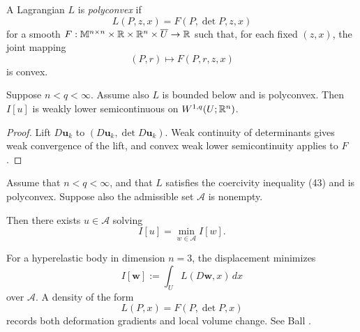 \begin{definition}
\label{def:polyconvex-lagrangian}
A Lagrangian $L$ is \textit{polyconvex} if
\[
L(P,z,x)=F(P,\det P,z,x)
\tag{51}
\]
for a smooth $F:\mathbb M^{n\times n}\times\mathbb{R}\times\mathbb{R}^n\times\overline U\to\mathbb{R}$ such that, for each fixed $(z,x)$, the joint mapping
\[
(P,r)\longmapsto F(P,r,z,x)
\tag{52}
\]
is convex.
\end{definition}

\begin{theorem}
\label{thm:lower-semicontinuity-polyconvex}

Suppose $n < q < \infty$. Assume also $L$ is bounded below and is polyconvex. Then $I[u]$ is weakly lower semicontinuous on $W^{1,q}(U;\mathbb{R}^n)$.
\end{theorem}

\begin{proof}
\sketch Lift $D\mathbf u_k$ to $(D\mathbf u_k,\det D\mathbf u_k)$. Weak continuity of determinants gives weak convergence of the lift, and convex weak lower semicontinuity applies to $F$.
\end{proof}

\begin{theorem}
\label{thm:existence-minimizer-polyconvex}

Assume that $n < q < \infty$, and that $L$ satisfies the coercivity inequality (43) and is polyconvex. Suppose also the admissible set $\mathcal{A}$ is nonempty.

Then there exists $u \in \mathcal{A}$ solving
\[
I[u] = \min_{w \in \mathcal{A}} I[w].
\]
\end{theorem}

\begin{example}
\label{ex:polyconvexity-nonlinear-elasticity}

For a hyperelastic body in dimension $n=3$, the displacement minimizes
\[
I[\mathbf{w}] := \int_U L(D\mathbf{w}, x)\, dx
\]
over $\mathcal A$. A density of the form
\[
L(P,x)=F(P,\det P,x)
\]
records both deformation gradients and local volume change. See Ball \cite{Ball1977}.
\end{example}

